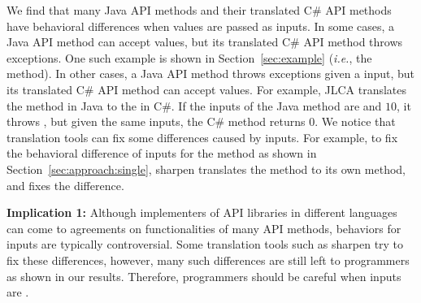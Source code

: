 We find that many Java API methods and their translated C\# API methods have behavioral differences when  values are passed as inputs. In some cases, a Java API method can accept  values, but its translated C\# API method throws exceptions. One such example is shown in Section~\ref{sec:example} (\emph{i.e.}, the  method). In other cases, a Java API method throws exceptions given a  input, but its translated C\# API method can accept  values. For example, JLCA translates the  method in Java to the  in C\#. If the inputs of the Java method are  and $10$, it throws , but given the same inputs, the C\# method returns 0. We notice that translation tools can fix some differences caused by  inputs. For example, to fix the behavioral difference of  inputs for the  method as shown in Section~\ref{sec:approach:single}, sharpen translates the method to its own method, and fixes the difference.


\textbf{Implication 1:} Although implementers of API libraries in different languages can come to agreements on functionalities of many API methods, behaviors for  inputs are typically controversial. Some translation tools such as sharpen try to fix these differences, however, many such differences are still left to programmers as shown in our results. Therefore, programmers should be careful when inputs are .

